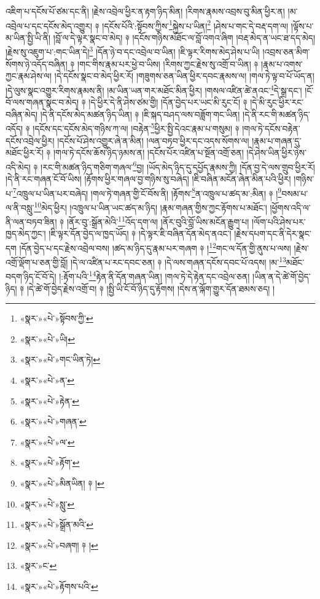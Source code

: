 འཇིག་པ་དངོས་པོ་ཙམ་དང་ནི། །རྗེས་འབྲེལ་ཕྱིར་ན་རྟག་ཉིད་མིན། །རིགས་རྣམས་འབྲས་བུ་མིན་ཕྱིར་ན། །མ་འབྲེལ་པ་དང་དངོས་མེད་འགྱུར། ༈ །དངོས་པོའི་:སྟོབས་ཀྱིས་\footnote{«སྣར་»«པེ་»སྟོབས་ཀྱི་}སྐྱེས་པ་ཡིན།\footnote{«སྣར་»«པེ་»ཡི།} །ཤེས་པ་གང་དེ་བརྡ་དག་ལ། །ལྟོས་པ་མ་ཡིན་སྤྱི་ཡི་ནི། །བློ་ལ་དེ་ལྟར་སྣང་བ་མེད། ༈ །དངོས་གཉིས་མཐོང་ལ་བློ་འགའ་ཞིག །བརྡ་མེད་ན་ཡང་ཐ་དད་མེད། །རྗེས་སུ་འཇུག་པ་:གང་ཡིན་དེ།\footnote{«སྣར་»«པེ་»གང་ཡིན་ཏེ།} །དོན་ཉེ་བ་དང་འབྲེལ་བ་ཡིན། །ཇི་ལྟར་རིགས་མེད་ཤེས་པ་ཡི། །འབྲས་ཅན་མིག་སོགས་ཉེ་འདོད་བཞིན། ༈ །གང་གིས་རྣམ་པར་ཕྱེ་བ་ཡིས། །རིགས་ཀྱང་རྗེས་སུ་འགྲོ་བ་ཡིན། ༈ །རྣམ་པ་འགས་ཀྱང་རྣམ་ཤེས་ལ། །དེ་དངོས་སྣང་བ་མེད་ཕྱིར་རོ། །གཟུགས་ཅན་ཡིན་ཕྱིར་དབང་རྣམས་ལ། །གལ་ཏེ་ལྟ་བ་པོ་ཡོད་ན། །དེ་ལུས་སྣང་འགྱུར་རིགས་རྣམས་ནི། །མ་ཡིན་ཡན་གར་མཐོང་མིན་ཕྱིར། །གསལ་འཛིན་ཚེ་ནའང་\footnote{«སྣར་»«པེ་»ན་}དེ་སྒྲ་དང་། །ངོ་བོ་ལས་གཞན་སྣང་བ་མེད། ༈ །དེ་ཕྱིར་དེ་ནི་ཤེས་ཙམ་གྱི། །དོན་བྱེད་པར་ཡང་མི་རུང་ངོ། ༈ །དེ་མི་རུང་ཕྱིར་རང་བཞིན་མེད། །དེ་ནི་དངོས་མེད་མཚན་ཉིད་ཡིན། ༈ །ཇི་སྐད་བཤད་ལས་བཟློག་གང་ཡིན། །དེ་ནི་རང་གི་མཚན་ཉིད་འདོད། ༈ །དངོས་དང་དངོས་མེད་གཉིས་ཀ་ལ། །བརྟེན་\footnote{«སྣར་»«པེ་»རྟེན་}ཕྱིར་སྤྱི་དེའང་རྣམ་པ་གསུམ། ༈ །གལ་ཏེ་དངོས་བརྟེན་དངོས་འབྲེལ་ཕྱིར། །དངོས་པོ་ཤེས་འགྱུར་ཞེ་ན་མིན། །ལན་བཏབ་ཕྱིར་དང་འདས་སོགས་ལ། །རྣམ་པ་གཞན་དུ་མཐོང་ཕྱིར་རོ། ༈ །གལ་ཏེ་དངོས་ཆོས་ཉིད་ཉམས་ན། །དངོས་པོར་འཛིན་པ་སྔོན་འགྲོ་ཅན། །དེ་ཤེས་ཡིན་ཕྱིར་ཉེས་འདི་མེད། ༈ །རང་གི་མཚན་ཉིད་གཅིག་གཞལ་\footnote{«སྣར་»«པེ་»གཞན་}བྱ། །ཡོད་མེད་ཉིད་དུ་དཔྱོད་རྣམས་ཀྱི། །དོན་བྱ་དེ་ལས་གྲུབ་ཕྱིར་རོ། །དེ་ནི་རང་གཞན་ངོ་བོ་ཡིས། །རྟོགས་ཕྱིར་གཞལ་བྱ་གཉིས་སུ་བཞེད། །ཇི་བཞིན་མངོན་ཞེན་མིན་པའི་ཕྱིར། །གཉིས་པ་\footnote{«སྣར་»«པེ་»ལ་}འཁྲུལ་པ་ཡིན་པར་བཞེད། །གལ་ཏེ་གཞན་གྱི་ངོ་བོས་ནི། །རྟོགས་\footnote{«སྣར་»«པེ་»རྟོག་}ན་འཁྲུལ་པ་ཚད་མ་:མིན། ༈ །\footnote{«སྣར་»«པེ་»མིནཡིན། ༈ །}བསམ་པ་ལ་ནི་བསླུ་\footnote{«སྣར་»«པེ་»སླུ་}མེད་ཕྱིར། །འཁྲུལ་པ་ཡིན་ཡང་ཚད་མ་ཉིད། །རྣམ་གཞན་གྱིས་ཀྱང་རྟོགས་པ་མཐོང་། །ཕྱོགས་འདི་ལ་ནི་ལན་བཏབ་ཟིན། ༈ །ནོར་བུ་:སྒྲོན་མེའི་\footnote{«སྣར་»«པེ་»སྒྲོན་མའི་}འོད་དག་ལ། །ནོར་བུའི་བློ་ཡིས་མངོན་རྒྱུག་པ། །ལོག་པའི་ཤེས་པར་ཁྱད་མེད་ཀྱང་། །ཇི་ལྟར་དོན་བྱེད་ལ་ཁྱད་ཡོད། ༈ །དེ་ལྟར་ཇི་བཞིན་དོན་མེད་ནའང་། །རྗེས་དཔག་དང་ནི་དེར་སྣང་དག །དོན་བྱེད་པ་དང་རྗེས་འབྲེལ་བས། །ཚད་མ་ཉིད་དུ་རྣམ་པར་གཞག ༈ །\footnote{«སྣར་»«པེ་»བཞག། ༈ །}གང་ལ་དོན་གྱི་ནུས་པ་ལས། །རྗེས་འགྲོ་ལྡོག་པ་ཅན་གྱི་བློ། །དེ་ལ་འཛིན་པ་རང་དབང་ཅན། ༈ །དེ་ལས་གཞན་དངོས་དབང་པོ་འདས། །མ་\footnote{«སྣར་»ང་}མཐོང་བདག་ཉིད་ངོ་བོ་དེ། །:རྟོག་པའི་\footnote{«སྣར་»«པེ་»རྟོགས་པའི་}རྟེན་ནི་དོན་གཞན་ཡིན། །གལ་ཏེ་དེ་རྟེན་དང་འབྲེལ་ཅན། །ཡིན་ན་དེ་ཚེ་གོ་བྱེད་ཉིད། ༈ །དེ་ཚེ་གོ་བྱེད་རྗེས་འགྲོ་བ། ༈ །སྤྱི་ཡི་ངོ་བོ་ཉིད་དུ་རྟོགས། །དེས་ན་ལྐོག་གྱུར་དོན་ཐམས་ཅད། །
